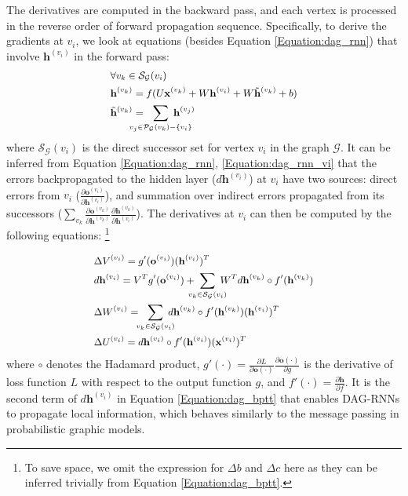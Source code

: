 \documentclass[10pt,twocolumn,letterpaper]{article}
\newcommand \hh {\mathbf{h}}
\newcommand \oo {\mathbf{o}}
\newcommand \xx {\mathbf{x}}
\begin{document}
The derivatives are computed in the backward pass, and each vertex is processed in the reverse order of forward propagation sequence. Specifically, to derive the gradients at $v_i$, we look at equations (besides Equation \ref{Equation:dag_rnn}) that involve $\hh^{(v_i)}$ in the forward pass:
\begin{equation}
\small
\begin{aligned}
&\forall v_k \in \mathcal{S}_{\mathcal{G}}(v_i)\\
&\hh^{(v_k)} = f(U\xx^{(v_k)} + W\hh^{(v_i)} + W\tilde{\hh}^{(v_k)}  + b)\\
&\tilde{\hh}^{(v_k)}  = \!\!\!\!\!\!\!\!\!\! \sum_{v_j \in \mathcal{P}_{\mathcal{G}}(v_k) - \{v_i\}}  \!\!\!\!\!\!\!\!\!\!\!\! \hh^{(v_j)}\\
\end{aligned}
\label{Equation:dag_rnn_vi}
\end{equation}
where $\mathcal{S}_{\mathcal{G}}(v_i)$ is the direct successor set for vertex $v_i$ in the graph $\mathcal{G}$. It can be inferred from Equation \ref{Equation:dag_rnn}, \ref{Equation:dag_rnn_vi} that the errors backpropagated to the hidden layer  ($d\hh^{(v_i)}$) at $v_i$ have two sources: direct errors from $v_i$ ($\frac{\partial \oo^{(v_i)}}{\partial \hh^{(v_i)}}$), and summation over indirect errors propagated from its successors ($\sum_{v_k}\!\!\frac{\partial \oo^{(v_k)}}{\partial \hh^{(v_k)}} \frac{\partial \hh^{(v_k)}}{\partial \hh^{(v_i)}}$). The derivatives at $v_i$ can then be computed by the following equations:
\footnote{To save space, we omit the expression for $\Delta b$ and $\Delta c$ here as they can be inferred trivially from Equation \ref{Equation:dag_bptt}.}

\begin{equation}
\small
\begin{aligned}
&\Delta V^{(v_i)} =  g'(\oo^{(v_i)}) (\hh^{(v_i)})^T \\
&d\hh^{(v_i)} = V^T g'(\oo^{(v_i)})+ \!\!\!\!\! \sum_{v_k \in \mathcal{S}_{\mathcal{G}}{(v_i)}} \!\!\!\!\! W^T d\hh^{(v_k)} \circ f'(\hh^{(v_k)}) \\
&\Delta W^{(v_i)} =  \!\!\!\sum_{v_k \in \mathcal{S}_{\mathcal{G}}(v_i)}\!\!\!\!\! d\hh^{(v_k)} \circ f'(\hh^{(v_k)})(\hh^{(v_i)})^T \\
&\Delta U^{(v_i)} =  d\hh^{(v_i)} \circ f'(\hh^{(v_i)}) (\xx^{(v_i)})^T
\end{aligned}
\label{Equation:dag_bptt}
\end{equation}
where $\circ$ denotes the Hadamard product, $g'(\cdot) = \frac{\partial L}{\partial \oo(\cdot)}\frac{\partial \oo(\cdot)}{\partial g}$ is the derivative of loss function $L$ with respect to the output function $g$, and $f'(\cdot) = \frac{\partial \hh}{\partial f}$.
It is  the second term of $d\hh^{(v_i)}$ in Equation \ref{Equation:dag_bptt} that enables DAG-RNNs to propagate local information, which behaves similarly to the message passing \cite{yedidia2003understanding} in probabilistic graphic models.
\end{document}
